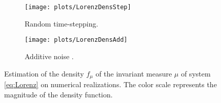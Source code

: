 \documentclass{siamart1116}
\numberwithin{theorem}{section}
\begin{document}
\begin{figure}[t]
	\begin{subfigure}[b]{0.49\textwidth}
		\texttt{[image: plots/LorenzDensStep]}
		\caption{Random time-stepping.}
	\end{subfigure}	
	\begin{subfigure}[b]{0.49\textwidth}
		\texttt{[image: plots/LorenzDensAdd]}
		\caption{Additive noise \cite{CGS16}.}
	\end{subfigure}
	\caption{Estimation of the density $f_\mu$ of the invariant measure $\mu$ of system \eqref{eq:Lorenz} on numerical realizations. The color scale represents the magnitude of the density function.}
	\label{fig:LorenzDensity}
\end{figure}



\end{document}
